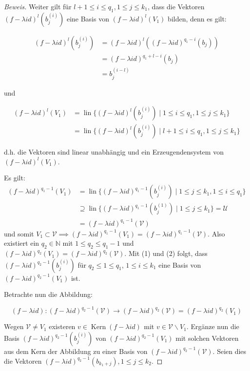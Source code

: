 \documentclass{article}
\newcommand{\V}{\mathcal{V}}
\newcommand{\U}{\mathcal{U}}
\newcommand{\N}{\mathbb{N}}
\newcommand{\basis}[2]{b_{#1}^{({#2})}}
\newcommand{\flam}[1]{(f-{\lambda}id)^{{#1}}}
\DeclareMathOperator{\Kern}{Kern}
\DeclareMathOperator{\lin}{lin}
\begin{document}
\begin{proof}[Beweis]
  Weiter gilt für $l+1 \le i \le q_1, 1 \le j \le k_1$, dass die Vektoren $\flam{l}(\basis{j}{i})$ eine Basis
  von $\flam{l}(V_1)$ bilden, denn es gilt:

  \begin{align*}
    \flam{l}(\basis{j}{i}) &= \flam{l}(\flam{q_1-i}(b_j)) \\
                           &= \flam{q_1+l-i}(b_j) \\
                           &= \basis{j}{i-l}
  \end{align*}

  und

  \begin{align}
    \flam{l}(V_1) &= \lin \{\flam{l}(\basis{j}{i}) \mid 1 \le i \le q_1, 1 \le j \le k_1\} \\
                  &= \lin \{\flam{l}(\basis{j}{i}) \mid l+1 \le i \le q_1, 1 \le j \le k_1\}
  \end{align}

  d.h. die Vektoren sind linear unabhängig und ein Erzeugendensystem von $\flam{l}(V_1)$.

  
  Es gilt:
  \begin{align*}
    \flam{q_1-1}(V_1) &= \lin \{ \flam{q_1-1}(\basis{j}{i}) \mid 1 \le j \le k_1, 1 \le i \le q_1 \} \\
                      &\supseteq \lin \{ \flam{q_1-1}(\basis{j}{1}) \mid 1 \le j \le k_1\} = \U \\
                      &= \flam{q_1-1}(\V)
  \end{align*}
  und somit $V_1 \subset \V \implies \flam{q_1-1}(V_1) = \flam{q_1-1}(\V)$. Also existiert ein
  $q_2 \in \N$ mit $1 \le q_2 \le q_1-1$ und $\flam{q_2}(V_1) = \flam{q_2}(\V)$.
  Mit (1) und (2) folgt, dass $\flam{q_2-1}(\basis{j}{i})$ für
  $q_2 \le 1 \le q_1$, $1 \le i \le k_1$ eine Basis von $\flam{q_2-1}(V_1)$ ist.


  Betrachte nun die Abbildung:

  \begin{equation}
    \flam{} \colon \flam{q_2-1}(\V) \to \flam{q_2}(\V) = \flam{q_2}(V_1)
  \end{equation}

  Wegen $\V \neq V_1$ existeren $v \in \Kern \flam{}$ mit $v \in \V \backslash V_1$.
  Ergänze nun die Basis $\flam{q_2-1}(\basis{j}{i})$ von $\flam{q_2-1}(V_1)$ mit solchen
  Vektoren aus dem Kern der Abbildung zu einer Basis von $\flam{q_2-1}(\V)$.
  Seien dies die Vektoren $\flam{q_2-1}(b_{k_1+j}), 1 \le j \le k_2$.


\end{proof}
\end{document}
